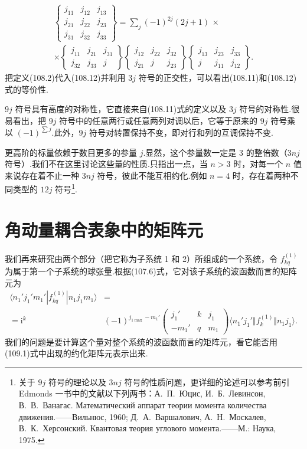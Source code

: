 \begin{equation}
\begin{aligned}
  \left\{\begin{array}{ccc}j_{11}&j_{12}&j_{13}\\j_{21}&j_{22}&j_{23}\\j_{31}&j_{32}&j_{33}\end{array}\right\}
  =\sum_j(-1)^{2j}(2j+1)\,\times\\
  \times\left\{\begin{array}{ccc}j_{11}&j_{21}&j_{31}\\j_{32}&j_{33}&j\end{array}\right\}
  \left\{\begin{array}{ccc}j_{12}&j_{22}&j_{32}\\j_{21}&j&j_{23}\end{array}\right\}
  \left\{\begin{array}{ccc}j_{13}&j_{23}&j_{33}\\j&j_{11}&j_{12}\end{array}\right\}.
\end{aligned}
\end{equation}
把定义(108.2)代入(108.12)并利用 $3j$ 符号的正交性，可以看出(108.11)和(108.12)式的等价性.

$9j$ 符号具有高度的对称性，它直接来自(108.11)式的定义以及 $3j$ 符号的对称性.很易看出，把 $9j$ 符号中的任意两行或任意两列对调以后，它等于原来的 $9j$ 符号乘以 $(-1)^{\sum j}$.此外，$9j$ 符号对转置保持不变，即对行和列的互调保持不变.

更高阶的标量依赖于数目更多的参量 $j$.显然，这个参量数一定是 3 的整倍数（$3nj$ 符号）.我们不在这里讨论这些量的性质.只指出一点，当 $n>3$ 时，对每一个 $n$ 值来说存在着不止一种 $3nj$ 符号，彼此不能互相约化.例如 $n=4$ 时，存在着两种不同类型的 $12j$ 符号\footnote{关于 $9j$ 符号的理论以及 $3nj$ 符号的性质问题，更详细的论述可以参考前引 Edmonds 一书中的文献以下列两书：А.~П.~Юцис, И.~Б.~Левинсон, В.~В.~Ванагас. Математический аппарат теории момента количества движения.——Вильнюс, 1960; Д.~А.~Варшалович, А.~Н.~Москалев, В.~К.~Херсонский. Квантовая теория углового момента.——М.: Наука, 1975.}.

\section{角动量耦合表象中的矩阵元}

我们再来研究由两个部分（把它称为子系统 1 和 2）所组成的一个系统，令 $f^{(1)}_{kq}$ 为属于第一个子系统的球张量.根据(107.6)式，它对该子系统的波函数而言的矩阵元为
\begin{equation}
\begin{aligned}
  \langle n_1'j_1'm_1'|f^{(1)}_{kq}|n_1j_1m_1\rangle&=\\
  =\mathrm{i}^k&(-1)^{j_{1\max}-m_1'}
  \left(\begin{array}{ccc}j_1'&k&j_1\\-m_1'&q&m_1\end{array}\right)
  \langle n_1'j_1'\Vert f^{(1)}_k\Vert n_1j_1\rangle.
\end{aligned}
\end{equation}
我们的问题是要计算这个量对整个系统的波函数而言的矩阵元，看它能否用(109.1)式中出现的约化矩阵元表示出来.

